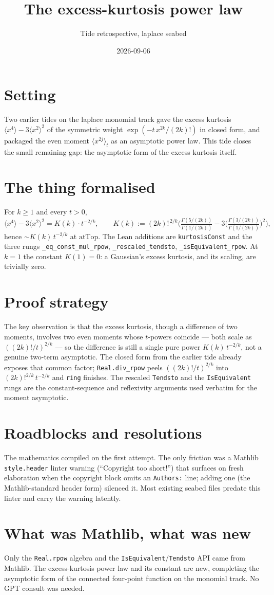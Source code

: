 \documentclass[11pt]{article}
\title{The excess-kurtosis power law}
\author{Tide retrospective, laplace seabed}
\date{2026-09-06}
\begin{document}
\sloppy
\maketitle
\section{Setting}
Two earlier tides on the laplace monomial track gave the excess kurtosis
$\langle x^4\rangle - 3\langle x^2\rangle^2$ of the symmetric weight $\exp(-t\,x^{2k}/(2k)!)$ in
closed form, and packaged the even moment $\langle x^{2j}\rangle_t$ as an asymptotic power law. This
tide closes the small remaining gap: the asymptotic form of the excess kurtosis itself.
\section{The thing formalised}
For $k\ge 1$ and every $t>0$,
\[
  \langle x^4\rangle - 3\langle x^2\rangle^2 = K(k)\cdot t^{-2/k},\qquad
  K(k) := (2k)!^{\,2/k}\Big(\tfrac{\Gamma(5/(2k))}{\Gamma(1/(2k))} - 3\big(\tfrac{\Gamma(3/(2k))}{\Gamma(1/(2k))}\big)^2\Big),
\]
hence $\sim K(k)\,t^{-2/k}$ at $\mathrm{atTop}$. The Lean additions are \texttt{kurtosisConst} and
the three rungs \texttt{\_eq\_const\_mul\_rpow}, \texttt{\_rescaled\_tendsto},
\texttt{\_isEquivalent\_rpow}. At $k=1$ the constant $K(1)=0$: a Gaussian's excess kurtosis, and its
scaling, are trivially zero.
\section{Proof strategy}
The key observation is that the excess kurtosis, though a difference of two moments, involves two
even moments whose $t$-powers coincide --- both scale as $((2k)!/t)^{2/k}$ --- so the difference is
still a single pure power $K(k)\,t^{-2/k}$, not a genuine two-term asymptotic. The closed form from
the earlier tide already exposes that common factor; \texttt{Real.div\_rpow} peels
$((2k)!/t)^{2/k}$ into $(2k)!^{2/k}\,t^{-2/k}$ and \texttt{ring} finishes. The rescaled
\texttt{Tendsto} and the \texttt{IsEquivalent} rungs are the constant-sequence and reflexivity
arguments used verbatim for the moment asymptotic.
\section{Roadblocks and resolutions}
The mathematics compiled on the first attempt. The only friction was a Mathlib \texttt{style.header}
linter warning (``Copyright too short!'') that surfaces on fresh elaboration when the copyright block
omits an \texttt{Authors:} line; adding one (the Mathlib-standard header form) silenced it. Most
existing seabed files predate this linter and carry the warning latently.
\section{What was Mathlib, what was new}
Only the \texttt{Real.rpow} algebra and the \texttt{IsEquivalent}/\texttt{Tendsto} API came from
Mathlib. The excess-kurtosis power law and its constant are new, completing the asymptotic form of
the connected four-point function on the monomial track. No GPT consult was needed.
\end{document}
